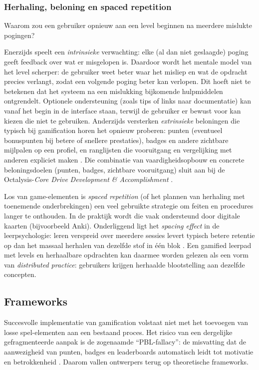 \subsubsection{Herhaling, beloning en spaced repetition}

Waarom zou een gebruiker opnieuw aan een level beginnen na meerdere mislukte pogingen?

Enerzijds speelt een \emph{intrinsieke} verwachting: elke (al dan niet geslaagde) poging geeft feedback over wat er misgelopen is.
Daardoor wordt het mentale model van het level scherper: de gebruiker weet beter waar het misliep en wat de opdracht precies verlangt, zodat een volgende poging beter kan verlopen.
Dit hoeft niet te betekenen dat het systeem na een mislukking bijkomende hulpmiddelen ontgrendelt. Optionele ondersteuning (zoals tips of links naar documentatie) kan vanaf het begin in de interface staan, terwijl de gebruiker er bewust voor kan kiezen die niet te gebruiken.
Anderzijds versterken \emph{extrinsieke} beloningen die typisch bij gamification horen het opnieuw proberen: punten (eventueel bonuspunten bij betere of snellere prestaties), badges en andere zichtbare mijlpalen op een profiel, en ranglijsten die vooruitgang en vergelijking met anderen expliciet maken \autocite{KevinWerbach2020}.
Die combinatie van vaardigheidsopbouw en concrete beloningsdoelen (punten, badges, zichtbare vooruitgang) sluit aan bij de Octalysis-\emph{Core Drive} \textit{Development \& Accomplishment} \autocite{Chou2015}.

Los van game-elementen is \emph{spaced repetition} (of het plannen van herhaling met toenemende onderbrekingen) een veel gebruikte strategie om feiten en procedures langer te onthouden. 
In de praktijk wordt die vaak ondersteund door digitale kaarten (bijvoorbeeld Anki).
Onderliggend ligt het \emph{spacing effect} in de leerpsychologie: leren verspreid over meerdere sessies levert typisch betere retentie op dan het massaal herhalen van dezelfde stof in één blok \autocite{Cepeda2006}.
Een gamified leerpad met levels en herhaalbare opdrachten kan daarmee worden gelezen als een vorm van \emph{distributed practice}: gebruikers krijgen herhaalde blootstelling aan dezelfde concepten.

\subsection{Frameworks}
Succesvolle implementatie van gamification volstaat niet met het toevoegen van losse spel-elementen aan een bestaand proces. 
Het risico van een dergelijke gefragmenteerde aanpak is de zogenaamde \enquote{PBL-fallacy}: de misvatting dat de aanwezigheid van punten, badges en leaderboards automatisch leidt tot motivatie en betrokkenheid \autocite{KevinWerbach2020}.
Daarom vallen ontwerpers terug op theoretische frameworks.

